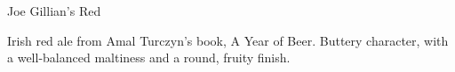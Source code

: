 \documentclass[parskip=half,fontsize=9pt,oneside]{scrbook}
\begin{document}
\mainmatter


\begin{recipe}{Joe Gillian's Red}

\begin{aboutblock}
Irish red ale from Amal Turczyn's book, A Year of Beer. Buttery character, with
a well-balanced maltiness and a round, fruity finish. \sourceaha
\end{aboutblock}


\begin{methodandtiming}
 
\begin{mashsteps}
\end{mashsteps}

\begin{fermentationsteps}
\end{fermentationsteps}

\end{methodandtiming}

\recipebreak

\begin{ingredientsblock}

\begin{malts}
\end{malts}

\begin{hops}
\end{hops}


\end{ingredientsblock}

\end{recipe}


\end{document}
